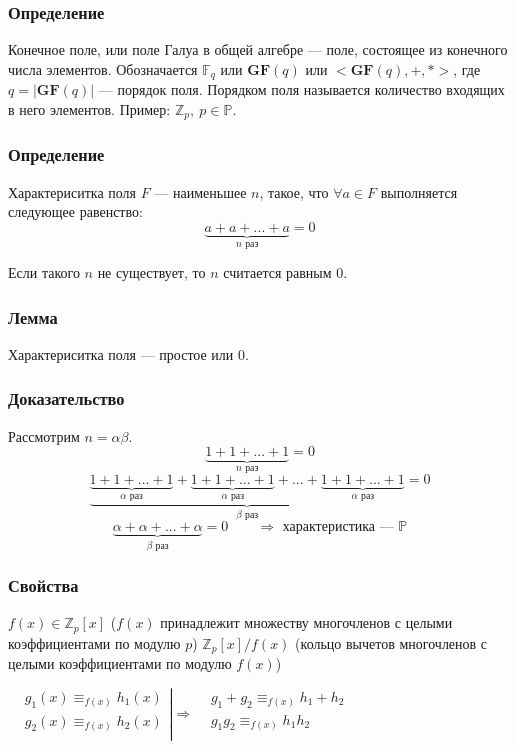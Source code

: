 \documentclass[12pt]{article}
\begin{document}
\subsubsection{Определение}
Конечное поле, или поле Галуа в общей алгебре — поле, состоящее из конечного числа элементов. Обозначается $\mathbb{F}_q$ или $\mathbf{GF}(q)$ или $<\mathbf{GF}(q), +, *>$, где $q = |\mathbf{GF}(q)|$ — порядок поля. Порядком поля называется количество входящих в него элементов. Пример: $\mathbb{Z}_p,\ p \in \mathbb{P}$.
\subsubsection{Определение}
Характериситка поля $F$ — наименьшее $n$, такое, что $\forall a \in F$ выполняется следующее равенство:
\[
    \underbrace{a + a + ... + a}_{n\text{ раз}} = 0
\]

Если такого $n$ не существует, то $n$ считается равным $0$.

\subsubsection{Лемма}
Характериситка поля — простое или $0$.
\subsubsection{Доказательство}
Рассмотрим $n = \alpha \beta$.
\[
    \underbrace{1 + 1 + ... + 1}_{n \text{ раз}} = 0
\]
\[
    \underbrace{\underbrace{1 + 1 + ... + 1}_{\alpha \text{ раз}} + \underbrace{1 + 1 + ... + 1}_{\alpha \text{ раз}} + ... + \underbrace{1 + 1 + ... + 1}_{\alpha \text{ раз}}}_{\beta \text{ раз}} = 0
\]
\[
    \underbrace{\alpha + \alpha + ... + \alpha}_{\beta \text{ раз}} = 0 \qquad \Rightarrow \text{ характеристика — } \mathbb{P}
\]
\subsubsection{Свойства}
$f(x) \in \mathbb{Z}_p[x]$ ($f(x)$ принадлежит множеству многочленов с целыми коэффициентами по модулю $p$)  $\mathbb{Z}_p[x] / f(x)$ (кольцо вычетов многочленов с целыми коэффициентами по модулю $f(x)$)

$
    \displaystyle
    \left.\begin{aligned}
         & g_1(x) \equiv_{f(x)} h_1(x) \\
         & g_2(x) \equiv_{f(x)} h_2(x) \\
    \end{aligned}\right| \Rightarrow \begin{aligned}
         & g_1 + g_2 \equiv_{f(x)} h_1 + h_2 \\
         & g_1g_2 \equiv_{f(x)} h_1h_2       \\
    \end{aligned}
$
\end{document}
